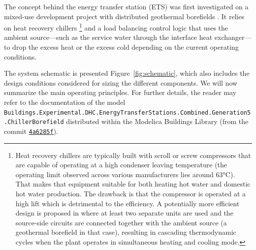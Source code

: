 The concept behind the energy transfer station (ETS) was first investigated on a mixed-use development project with distributed geothermal borefields \citep{WetterHu2019}.
It relies on heat recovery chillers%
\footnote{Heat recovery chillers are typically built with scroll or screw compressors that are capable of operating at a high condenser leaving temperature (the operating limit observed across various manufacturers lies around 63°C). That makes that equipment suitable for both heating hot water and domestic hot water production. The drawback is that the compressor is operated at a high lift which is detrimental to the efficiency. A potentially more efficient design is proposed in \cite{Cline2020} where at least two separate units are used and the source-side circuits are connected together with the ambient source (a geothermal borefield in that case), resulting in cascading thermodynamic cycles when the plant operates in simultaneous heating and cooling mode.}
and a load balancing control logic that uses the ambient source---such as the service water through the interface heat exchanger---to drop the excess heat or the excess cold depending on the current operating conditions.

The system schematic is presented Figure~\ref{fig:schematic}, which also includes the design conditions considered for sizing the different components.
We will now summarize the main operating principles. For further details, the reader may refer to the documentation of the model \lstinline|Buildings.Experimental.DHC.EnergyTransferStations.Combined.Generation5.ChillerBorefield| distributed within the Modelica Buildings Library (from the commit \href{https://github.com/lbl-srg/modelica-buildings/tree/4a6285f}{\lstinline|4a6285f|}).

